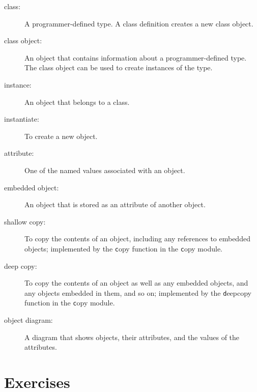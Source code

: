 \documentclass[
DIV=11,
fontsize=12,
twoside,
headinclude=false,
titlepage=firstiscover,
abstract=true,
headsepline=true,
footsepline=true,
chapterprefix=true, %
headings=big,
bibliography=totoc,%
captions=tableheading
]{scrbook}
\theoremstyle{definition}
\begin{document}
\begin{description}

\item[class:] A programmer-defined type.  A class definition creates a new
class object.

\item[class object:] An object that contains information about a
programmer-defined type.  The class object can be used to create instances
of the type.

\item[instance:] An object that belongs to a class.

\item[instantiate:] To create a new object.

\item[attribute:] One of the named values associated with an object.

\item[embedded object:] An object that is stored as an attribute
of another object.

\item[shallow copy:] To copy the contents of an object, including
any references to embedded objects;
implemented by the {\texttt copy} function in the {\texttt copy} module.

\item[deep copy:] To copy the contents of an object as well as any
embedded objects, and any objects embedded in them, and so on;
implemented by the {\texttt deepcopy} function in the {\texttt copy} module.

\item[object diagram:] A diagram that shows objects, their
attributes, and the values of the attributes.

\end{description}


\section{Exercises}
\end{document}
